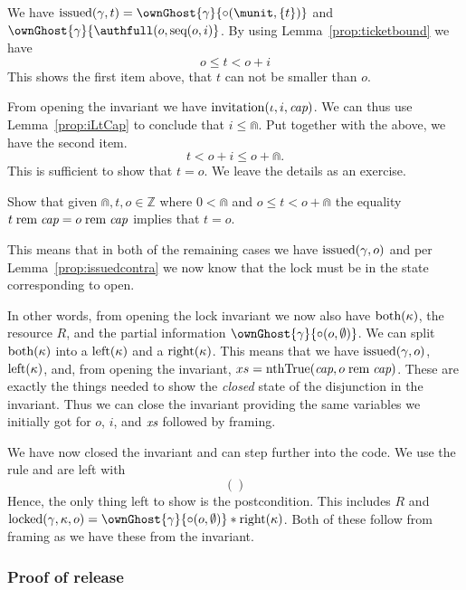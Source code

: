 We have $\issued(\gamma, t) = \ownGhost{\gamma}{\circ(\munit, \{ t \})}$ and
$\ownGhost{\gamma}{\authfull(o, \seq(o, i)}$. By using
Lemma~\ref{prop:ticketbound} we have
\[
  o \leq t < o + i
\]
This shows the first item above, that $t$ can not be smaller than $o$.

From opening the invariant we have 
$\operatorname{invitation}(\iota, i, \textit{cap})$. We can thus use Lemma~\ref{prop:iLtCap} to
conclude that $i \leq \Cap$. Put together with the above, we have the second
item.
\[ t < o + i \leq o + \Cap. \] This is sufficient to show that $t = o$. We leave
the details as an exercise.
\begin{exercise}
  Show that given $\Cap, t, o \in \mathbb{Z}$ where $0 < \Cap$ and $o \leq t < o
  + \Cap$ the equality $t \;\mathrm{rem}\; \textit{cap} = o \;\mathrm{rem}\; \textit{cap}$ implies that $ t = o $.
\end{exercise}


This means that in both of the remaining cases we have $\operatorname{issued}(\gamma, o)$ and
per Lemma~\ref{prop:issuedcontra} we now know that the lock must be in the
state corresponding to open.

In other words, from opening the lock invariant we now also have $\text{both}(\kappa)$, the resource $R$, and the partial information $\ownGhost{\gamma}{\circ(o, \emptyset)}$.
We can split $\text{both}(\kappa)$ into a $\text{left}(\kappa)$ and a $\text{right}(\kappa)$.
This means that we have $\operatorname{issued}(\gamma, o)$, $\text{left}(\kappa)$, and, from opening the invariant, $xs = \text{nthTrue}(\textit{cap}, o \;\mathrm{rem}\; \textit{cap})$.
These are exactly the things needed to show the \textit{closed} state of the disjunction in the invariant.
Thus we can close the invariant providing the same variables we initially got for $o$, $i$, and $\textit{xs}$ followed by framing.

We have now closed the invariant and can step further into the code. We use the
 rule and are left with
\[
  ()
\]
Hence, the only thing left to show is the postcondition. This includes $R$ and
$\lockedGKO = \ownGhost{\gamma}{\circ(o, \emptyset)} \ast \rightK$. Both of
these follow from framing as we have these from the invariant.

\subsubsection{Proof of release}

